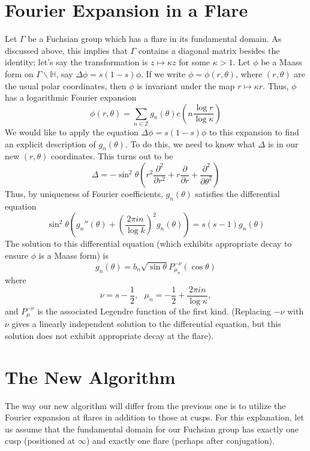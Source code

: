 \documentclass[]{article}
\begin{document}
\section*{Fourier Expansion in a Flare}

Let $\Gamma$ be a Fuchsian group which has a flare in its fundamental domain.
As discussed above, this implies that $\Gamma$ contains a diagonal matrix besides the identity; let's say the transformation is $z \mapsto \kappa z$ for some $\kappa > 1$.
Let $\phi$ be a Maass form on $\Gamma\backslash\mathbb{H}$, say $\Delta \phi = s(1-s)\phi$.
If we write $\phi = \phi(r, \theta)$, where $(r, \theta)$ are the usual polar coordinates, then $\phi$ is invariant under the map $r \mapsto \kappa r$.
Thus, $\phi$ has a logarithmic Fourier expansion
$$
\phi(r, \theta) = \sum_{n\in\mathbb{Z}}g_n(\theta)e\left( n\frac{\log r}{\log \kappa} \right)
$$
We would like to apply the equation $\Delta\phi = s(1-s)\phi$ to this expansion to find an explicit description of $g_n(\theta)$.
To do this, we need to know what $\Delta$ is in our new $(r, \theta)$ coordinates.
This turns out to be
\begin{equation}\label{polarL-B}
	\Delta = -\sin^2\theta\left(r^2\frac{\partial^2}{\partial r^2} + r\frac{\partial}{\partial r} + \frac{\partial^2}{\partial\theta^2}\right)
\end{equation}
Thus, by uniqueness of Fourier coefficients, $g_n(\theta)$ satisfies the differential equation
$$
\sin^2\theta\left( g_n''(\theta) + \left( \frac{2\pi in}{\log k} \right)^2g_n(\theta) \right) = s(s-1)g_n(\theta)
$$
The solution to this differential equation (which exhibits appropriate decay to ensure $\phi$ is a Maass form) is
\begin{equation}\label{solnDE}
g_n(\theta) = b_n\sqrt{\sin\theta}P^{-\nu}_{\mu_n}(\cos\theta)
\end{equation}
where
$$
\nu = s - \frac{1}{2}, ~~~ \mu_n = -\frac{1}{2} + \frac{2\pi in}{\log \kappa},
$$
and $P_\mu^{-\nu}$ is the associated Legendre function of the first kind.
(Replacing $-\nu$ with $\nu$ gives a linearly independent solution to the differential equation, but this solution does not exhibit appropriate decay at the flare).

\section*{The New Algorithm}

The way our new algorithm will differ from the previous one is to utilize the Fourier expansion at flares in addition to those at cusps.
For this explanation, let us assume that the fundamental domain for our Fuchsian group has exactly one cusp (positioned at $\infty$) and exactly one flare (perhaps after conjugation).
\end{document}

